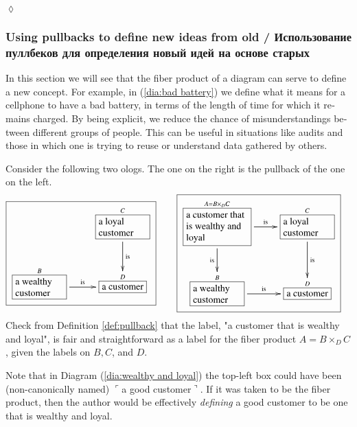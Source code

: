 \documentclass{book}
\def\tn{\textnormal}
\def\hsp{\hspace{.3in}}
\def\rr{\raggedright}
\newcommand{\LA}[2]{\ar[#1]^-{\tn {#2}}}
\newcommand{\LAL}[2]{\ar[#1]_-{\tn {#2}}}
\newcommand{\obox}[3]{\stackrel{#1}{\fbox{\parbox{#2}{#3}}}}
\newcommand{\smbox}[2]{\stackrel{#1}{\fbox{#2}}}
\newcommand{\fakebox}[1]{\tn{$\ulcorner$#1$\urcorner$}}
\theoremstyle{theoremENG}
\theoremstyle{lemmaENG}
\theoremstyle{propositionENG}
\theoremstyle{corollaryENG}
\theoremstyle{factENG}
\theoremstyle{remarkENG}
\newtheorem{remarkENG}[subsubsection]{\begin{english}Remark\end{english}}
\theoremstyle{exampleENG}
\newtheorem{exampleENG}[subsubsection]{\begin{english}Example\end{english}}
\theoremstyle{warningENG}
\theoremstyle{questionENG}
\theoremstyle{guessENG}
\theoremstyle{answerENG}
\theoremstyle{constructionENG}
\theoremstyle{rulesENG}
\theoremstyle{excENG}
\newtheorem{excENG}[subsubsection]{\begin{english}Exercise\end{english}}
\theoremstyle{appENG}
\theoremstyle{definitionENG}
\theoremstyle{notationENG}
\theoremstyle{conjectureENG}
\theoremstyle{postulateENG}
\newenvironment{exerciseENG}{\begin{excENG}}{\hspace*{\fill}$\lozenge$\end{excENG}}
\theoremstyle{theoremRUS}
\theoremstyle{lemmaRUS}
\theoremstyle{propositionRUS}
\theoremstyle{corollaryRUS}
\theoremstyle{factRUS}
\theoremstyle{remarkRUS}
\theoremstyle{exampleRUS}
\theoremstyle{warningRUS}
\theoremstyle{questionRUS}
\theoremstyle{guessRUS}
\theoremstyle{answerRUS}
\theoremstyle{constructionRUS}
\theoremstyle{rulesRUS}
\theoremstyle{excRUS}
\theoremstyle{appRUS}
\theoremstyle{definitionRUS}
\theoremstyle{notationRUS}
\theoremstyle{conjectureRUS}
\theoremstyle{postulateRUS}
\begin{document}
\begin{english}
\begin{exerciseENG}
\end{exerciseENG}


\subsubsection{Using pullbacks to define new ideas from old / Использование пуллбеков для определения новый идей на основе старых}

In this section we will see that the fiber product of a diagram can serve to define a new concept. For example, in (\ref{dia:bad battery}) we define what it means for a cellphone to have a bad battery, in terms of the length of time for which it remains charged. By being explicit, we reduce the chance of misunderstandings between different groups of people. This can be useful in situations like audits and those in which one is trying to reuse or understand data gathered by others.

\begin{russian} \end{russian}

\begin{exampleENG}

Consider the following two ologs. The one on the right is the pullback of the one on the left. 
\begin{align}\label{dia:wealthy and loyal}
\fbox{\xymatrixnocompile{&\obox{C}{.7in}{\rr a loyal customer}\LA{d}{is}\\\obox{B}{.7in}{\rr a wealthy customer}\LA{r}{is}&\smbox{D}{a customer}}}\hsp&\fbox{\xymatrix{\obox{A=B\times_DC}{.9in}{\rr a customer that is wealthy and loyal}\LAL{d}{is}\LA{r}{is}&\obox{C}{.7in}{\rr a loyal customer}\LA{d}{is}\\\obox{B}{.7in}{\rr a wealthy customer}\LA{r}{is}&\smbox{D}{a customer}}}
\end{align}
Check from Definition \ref{def:pullback} that the label, "a customer that is wealthy and loyal", is fair and straightforward as a label for the fiber product $A=B\times_DC$, given the labels on $B,C$, and $D$.

\begin{russian} \end{russian}

\end{exampleENG}

\begin{remarkENG}\label{rem:defining using pullbacks}

Note that in Diagram (\ref{dia:wealthy and loyal}) the top-left box could have been (non-canonically named) \fakebox{a good customer}. If it was taken to be the fiber product, then the author would be effectively {\em defining} a good customer to be one that is wealthy and loyal. 


\end{remarkENG}
\end{english}
\end{document}
